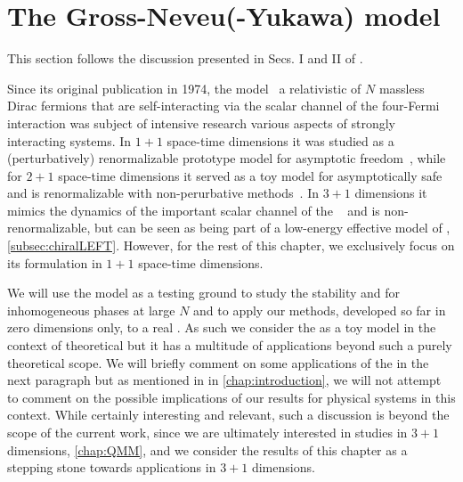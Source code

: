 \section{The Gross-Neveu(-Yukawa) model}\label{sec:gny}
\begin{disclaimer}
	This section follows the discussion presented in Secs. I and II of .
\end{disclaimer}
Since its original publication in 1974, the  model~\cite{Gross:1974jv} \dash{} a relativistic \qft{} of $N$ massless Dirac fermions that are self-interacting via the scalar channel of the four-Fermi interaction \dash{} was subject of intensive research \wrt{} various aspects of strongly interacting systems.
In $1 + 1$ space-time dimensions it was studied as a (perturbatively) renormalizable prototype model for asymptotic freedom~\cite{Gross:1974jv,Wetzel:1984nw,Rosenstein:1990nm,Gracey:1990sx,Gracey:1990wi,Gracey:1991vy,Luperini:1991sv,ZinnJustin:1991yn,Peskin:1995ev,ZinnJustin:2002ru,Quinto:2021lqn}, while for $2 + 1$ space-time dimensions it served as a toy model for asymptotically safe \qfts{}~\cite{Braun:2010tt} and is renormalizable with non-perurbative methods~\cite{Rosenstein:1988pt,Rosenstein:1988dj,Rosa:2000ju,Hofling:2002hj}.
In $3 + 1$ dimensions it mimics the dynamics of the important scalar channel of the \njlm{}~\cite{Nambu:1961fr,Nambu:1961tp} and is non-renormalizable, but can be seen as being part of a low-energy effective model of \qcd{}, \cf{} \cref{subsec:chiralLEFT}.
However, for the rest of this chapter, we exclusively focus on its formulation in $1 + 1$ space-time dimensions.

We will use the model as a testing ground to study the stability and \ggla{} for inhomogeneous phases at large $N$ and to apply our \frg{} \cfd{} methods, developed so far in zero dimensions only, to a real \qft{}.
As such we consider the \gnm{} as a toy model in the context of theoretical \hep{} but it has a multitude of applications beyond such a purely theoretical scope. 
We will briefly comment on some applications of the \gnm{} in the next paragraph but as mentioned in  in \cref{chap:introduction}, we will not attempt to comment on the possible implications of our results for physical systems in this context. 
While certainly interesting and relevant, such a discussion is beyond the scope of the current work, since we are ultimately interested in studies in $3+1$ dimensions, \cf{} \cref{chap:QMM}, and we consider the results of this chapter as a stepping stone towards applications in $3+1$ dimensions.

